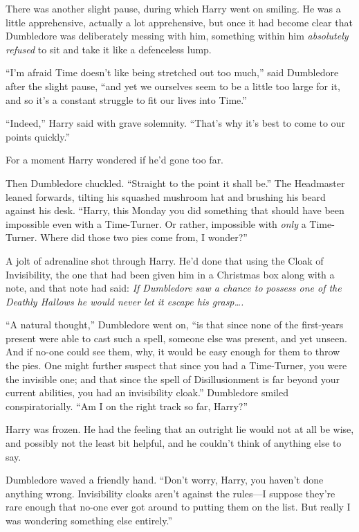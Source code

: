 There was another slight pause, during which Harry went on smiling. He was a little apprehensive, actually a lot apprehensive, but once it had become clear that Dumbledore was deliberately messing with him, something within him \emph{absolutely refused} to sit and take it like a defenceless lump.

“I’m afraid Time doesn’t like being stretched out too much,” said Dumbledore after the slight pause, “and yet we ourselves seem to be a little too large for it, and so it’s a constant struggle to fit our lives into Time.”

“Indeed,” Harry said with grave solemnity.
“That’s why it’s best to come to our points quickly.”

For a moment Harry wondered if he’d gone too far.

Then Dumbledore chuckled.
“Straight to the point it shall be.” The Headmaster leaned forwards, tilting his squashed mushroom hat and brushing his beard against his desk.
“Harry, this Monday you did something that should have been impossible even with a Time-Turner. Or rather, impossible with \emph{only} a Time-Turner. Where did those two pies come from, I wonder?”

A jolt of adrenaline shot through Harry. He’d done that using the Cloak of Invisibility, the one that had been given him in a Christmas box along with a note, and that note had said: \emph{If Dumbledore saw a chance to possess one of the Deathly Hallows he would never let it escape his grasp….}

“A natural thought,” Dumbledore went on, “is that since none of the first-years present were able to cast such a spell, someone else was present, and yet unseen. And if no-one could see them, why, it would be easy enough for them to throw the pies. One might further suspect that since you had a Time-Turner, you were the invisible one; and that since the spell of Disillusionment is far beyond your current abilities, you had an invisibility cloak.” Dumbledore smiled conspiratorially.
“Am I on the right track so far, Harry?”

Harry was frozen. He had the feeling that an outright lie would not at all be wise, and possibly not the least bit helpful, and he couldn’t think of anything else to say.

Dumbledore waved a friendly hand.
“Don’t worry, Harry, you haven’t done anything wrong. Invisibility cloaks aren’t against the rules—I suppose they’re rare enough that no-one ever got around to putting them on the list. But really I was wondering something else entirely.”

